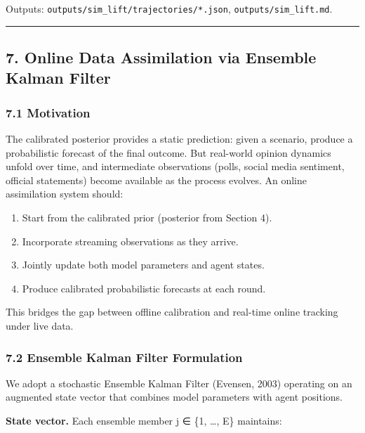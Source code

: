 \documentclass[
]{article}
\providecommand{\tightlist}{%
  \setlength{\itemsep}{0pt}\setlength{\parskip}{0pt}}
\begin{document}
Outputs: \texttt{outputs/sim\_lift/trajectories/*.json},
\texttt{outputs/sim\_lift.md}.

\begin{center}\rule{0.5\linewidth}{0.5pt}\end{center}

\subsection{7. Online Data Assimilation via Ensemble Kalman
Filter}\label{online-data-assimilation-via-ensemble-kalman-filter}

\subsubsection{7.1 Motivation}\label{motivation-3}

The calibrated posterior provides a static prediction: given a scenario,
produce a probabilistic forecast of the final outcome. But real-world
opinion dynamics unfold over time, and intermediate observations (polls,
social media sentiment, official statements) become available as the
process evolves. An online assimilation system should:

\begin{enumerate}
\def\labelenumi{\arabic{enumi}.}
\tightlist
\item
  Start from the calibrated prior (posterior from Section 4).
\item
  Incorporate streaming observations as they arrive.
\item
  Jointly update both model parameters and agent states.
\item
  Produce calibrated probabilistic forecasts at each round.
\end{enumerate}

This bridges the gap between offline calibration and real-time online
tracking under live data.

\subsubsection{7.2 Ensemble Kalman Filter
Formulation}\label{ensemble-kalman-filter-formulation}

We adopt a stochastic Ensemble Kalman Filter (Evensen, 2003) operating
on an augmented state vector that combines model parameters with agent
positions.

\textbf{State vector.} Each ensemble member j ∈ \{1, \ldots, E\}
maintains:
\end{document}
